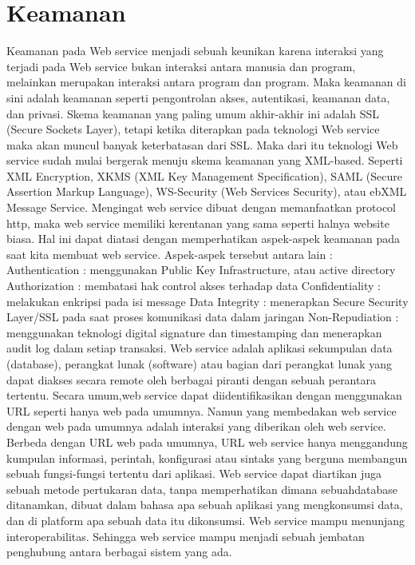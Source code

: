 \documentclass[a4paper,11pt]{book}
\begin{document}
\section{Keamanan}
Keamanan pada Web service menjadi sebuah keunikan karena interaksi yang terjadi pada Web service bukan interaksi antara manusia dan program, melainkan merupakan interaksi antara program dan program. Maka keamanan di sini adalah keamanan seperti pengontrolan akses, autentikasi, keamanan data, dan privasi. Skema keamanan yang paling umum akhir-akhir ini adalah SSL (Secure Sockets Layer), tetapi ketika diterapkan pada teknologi Web service maka akan muncul banyak keterbatasan dari SSL. Maka dari itu teknologi Web service sudah mulai bergerak menuju skema keamanan yang XML-based. Seperti XML Encryption, XKMS (XML Key Management Specification), SAML (Secure Assertion Markup Language), WS-Security (Web Services Security), atau ebXML Message Service.
Mengingat web service dibuat dengan memanfaatkan protocol http, maka web service memiliki kerentanan yang sama seperti halnya website biasa. Hal ini dapat diatasi dengan memperhatikan aspek-aspek keamanan pada saat kita membuat web service. Aspek-aspek tersebut antara lain :
Authentication : menggunakan Public Key Infrastructure, atau active directory
Authorization : membatasi hak control akses terhadap data
Confidentiality : melakukan enkripsi pada isi message
Data Integrity  :  menerapkan  Secure  Security Layer/SSL  pada  saat  proses komunikasi data dalam jaringan
Non-Repudiation : menggunakan teknologi digital signature dan timestamping dan menerapkan audit log dalam setiap transaksi.
Web service adalah aplikasi sekumpulan data (database), perangkat lunak (software) atau bagian dari perangkat lunak yang dapat diakses secara remote oleh berbagai piranti dengan sebuah perantara tertentu.  Secara umum,web service  dapat diidentifikasikan dengan menggunakan URL seperti hanya web pada umumnya. Namun yang membedakan web service dengan web pada umumnya adalah interaksi yang diberikan oleh web service. Berbeda dengan URL web pada umumnya, URL web service hanya menggandung kumpulan informasi, perintah, konfigurasi atau sintaks yang berguna membangun sebuah fungsi-fungsi tertentu dari aplikasi.
Web service dapat diartikan juga sebuah metode pertukaran data, tanpa memperhatikan dimana sebuahdatabase ditanamkan, dibuat dalam bahasa apa sebuah aplikasi yang mengkonsumsi data, dan di platform apa sebuah data itu dikonsumsi. Web service mampu menunjang interoperabilitas. Sehingga web service mampu menjadi sebuah jembatan penghubung antara berbagai sistem yang ada.
\end{document}
